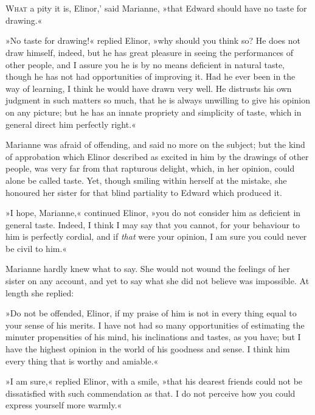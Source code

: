 \chapter[Chapter \thechapter]{}
	\lettrine[ante=`,lines=4,lraise=0.3]{W}{hat} a pity it is, Elinor,' said Marianne, »that Edward should have no taste for drawing.«

\zz
»No taste for drawing!« replied Elinor, »why should you think so? He does not draw himself, indeed, but he has great pleasure in seeing the performances of other people, and I assure you he is by no means deficient in natural taste, though he has not had opportunities of improving it. Had he ever been in the way of learning, I think he would have drawn very well. He distrusts his own judgment in such matters so much, that he is always unwilling to give his opinion on any picture; but he has an innate propriety and simplicity of taste, which in general direct him perfectly right.«

Marianne was afraid of offending, and said no more on the subject; but the kind of approbation which Elinor described as excited in him by the drawings of other people, was very far from that rapturous delight, which, in her opinion, could alone be called taste. Yet, though smiling within herself at the mistake, she honoured her sister for that blind partiality to Edward which produced it.

»I hope, Marianne,« continued Elinor, »you do not consider him as deficient in general taste. Indeed, I think I may say that you cannot, for your behaviour to him is perfectly cordial, and if \textit{that} were your opinion, I am sure you could never be civil to him.«

Marianne hardly knew what to say. She would not wound the feelings of her sister on any account, and yet to say what she did not believe was impossible. At length she replied:

»Do not be offended, Elinor, if my praise of him is not in every thing equal to your sense of his merits. I have not had so many opportunities of estimating the minuter propensities of his mind, his inclinations and tastes, as you have; but I have the highest opinion in the world of his goodness and sense. I think him every thing that is worthy and amiable.«

»I am sure,« replied Elinor, with a smile, »that his dearest friends could not be dissatisfied with such commendation as that. I do not perceive how you could express yourself more warmly.«


